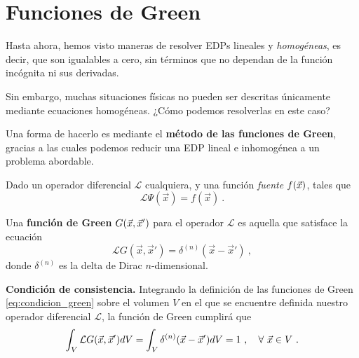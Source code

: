 \chapter{Funciones de Green}

Hasta ahora, hemos visto maneras de resolver EDPs lineales y \emph{homogéneas}, es decir, que son igualables a cero, sin términos que no dependan de la función incógnita ni sus derivadas.

Sin embargo, muchas situaciones físicas no pueden ser descritas únicamente mediante ecuaciones homogéneas. ¿Cómo podemos resolverlas en este caso?

Una forma de hacerlo es mediante el \textbf{método de las funciones de Green}, gracias a las cuales podemos reducir una EDP lineal e inhomogénea a un problema abordable.

\begin{defi} 
    Dado un operador diferencial $\mathcal{L}$ cualquiera, y una función \emph{fuente} $f(\vec{x})$, tales que
    \begin{equation}
        \mathcal{L}\Psi(\vec{x}) = f(\vec{x}) \ .
    \end{equation}

    Una \textbf{función de Green} $G(\vec{x}, \vec{x}')$ para el operador $\mathcal{L}$ es aquella que satisface la ecuación
    \begin{equation}\label{eq:condicion_green}
        \mathcal{L}G(\vec{x}, \vec{x}') = \delta^{(n)}(\vec{x} - \vec{x}') \ ,
    \end{equation}
    donde $\delta^{(n)}$ es la delta de Dirac $n$-dimensional.
\end{defi}

\begin{propiedad} 
    \textbf{Condición de consistencia.} Integrando la definición de las funciones de Green \eqref{eq:condicion_green} sobre el volumen $V$ en el que se encuentre definida nuestro operador diferencial $\mathcal{L}$, la función de Green cumplirá que
    \begin{equation} \label{eq:condicion_consistencia}
        \int_V \mathcal{L} G(\vec{x}, \vec{x}') dV = \int_V \delta^{(n)}(\vec{x} - \vec{x}') dV = 1 \ , \quad \forall \ \vec{x} \in V \ .
    \end{equation}
\end{propiedad}


